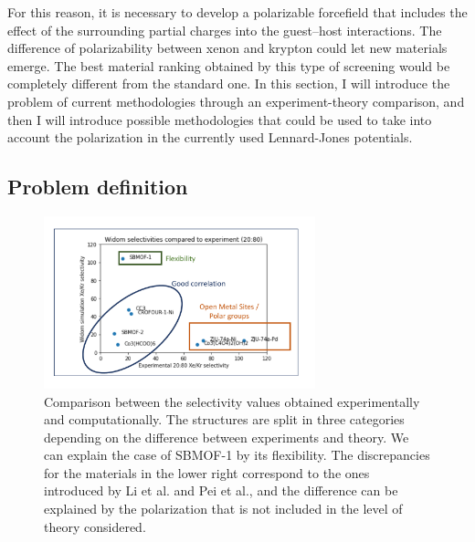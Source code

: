 \documentclass[main]{subfiles}
\begin{document}
For this reason, it is necessary to develop a polarizable forcefield that includes the effect of the surrounding partial charges into the guest--host interactions. The difference of polarizability between xenon and krypton could let new materials emerge. The best material ranking obtained by this type of screening would be completely different from the standard one. In this section, I will introduce the problem of current methodologies through an experiment-theory comparison, and then I will introduce possible methodologies that could be used to take into account the polarization in the currently used Lennard-Jones potentials.

\subsection{Problem definition}

\begin{figure}[ht]
  \centering
  \includegraphics[width=0.7\textwidth]{figures/6-perspectives/exp_theory_discrepancies.pdf}
  \caption{ Comparison between the selectivity values obtained experimentally and computationally. The structures are split in three categories depending on the difference between experiments and theory. We can explain the case of SBMOF-1 by its flexibility. The discrepancies for the materials in the lower right correspond to the ones introduced by Li et al. and Pei et al.,\autocite{Li_2019,Pei_2022} and the difference can be explained by the polarization that is not included in the level of theory considered.  }\label{fgr:exp_theory_discrepancy}
\end{figure}
\end{document}
